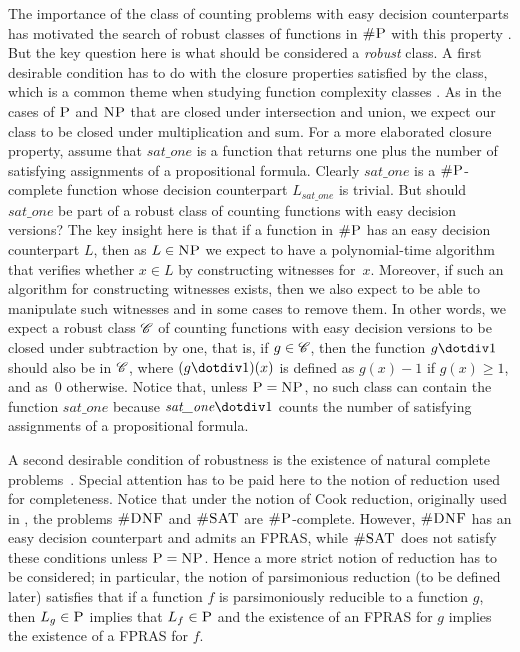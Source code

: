 The importance of the class of counting problems with easy decision counterparts has motivated the search of robust classes of functions in $\text{\sc \#P}$ with this property \cite{PagourtzisZ06}. But the key question here is what should be considered a {\em robust} class. 
A first desirable condition has to do with the closure properties satisfied by the class, which is a common theme when studying function complexity classes \cite{OH93,FH08}. As in the cases of $\text{\sc P}$ and $\text{\sc NP}$ that are closed under intersection and union, we expect our class to be closed under multiplication and sum. For a more elaborated closure property, assume that $\textit{sat\_one}$ is a function that returns one plus the number of satisfying assignments of a propositional formula. Clearly $\textit{sat\_one}$ is a $\text{\sc \#P}$-complete function whose decision counterpart $L_{\textit{sat\_one}}$ is trivial. But should $\textit{sat\_one}$ be part of a robust class of counting functions with easy decision versions? The key insight here is that if a function in $\text{\sc \#P}$ has an easy decision counterpart $L$, then as $L \in \text{\sc NP}$ we expect  to have a polynomial-time algorithm that verifies whether $x \in L$ by constructing witnesses for~$x$. 
Moreover, if such an algorithm for constructing witnesses exists, then we also expect to be able to manipulate such witnesses and in some cases to remove them. In other words, we expect a robust class $\mathscr{C}$ of counting functions with easy decision versions to be closed under subtraction by one, that is, if $g \in \mathscr{C}$, then the function $g \dotdiv 1$ should also be in $\mathscr{C}$, where $(g \dotdiv 1)(x)$ is defined as $g(x) - 1$ if $g(x) \geq 1$, and as~$0$ otherwise. Notice that, unless $\text{\sc P} = \text{\sc NP}$, no such class can contain the function $\textit{sat\_one}$ because $\textit{sat\_one} \dotdiv 1$ counts the number of satisfying assignments of a propositional formula.

A second desirable condition of robustness is the existence of natural complete problems~\cite{P94}. Special attention has to be paid here to the notion of reduction used for completeness. Notice that under the notion of Cook reduction, originally used in \cite{Valiant79}, the problems $\textsc{\#DNF}$ and $\textsc{\#SAT}$ are $\text{\sc \#P}$-complete. However, $\textsc{\#DNF}$ has an easy decision counterpart and admits an FPRAS, while $\textsc{\#SAT}$ does not satisfy these conditions unless $\text{\sc P} = \text{\sc NP}$. Hence a more strict notion of reduction has to be considered; in particular, the notion of parsimonious reduction (to be defined later) satisfies that if a function $f$ is parsimoniously reducible to a function $g$, then $L_g \in \text{\sc P}$ implies that $L_f \in \text{\sc P}$ and the existence of an FPRAS for $g$ implies the existence of a FPRAS for $f$. 

